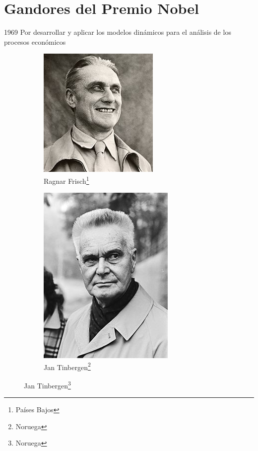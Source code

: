 \documentclass[aspectratio=169]{beamer}
\begin{document}
    \section{Gandores del Premio Nobel}
        \begin{frame}[t]{1969}
            \justify
            Por desarrollar y aplicar los modelos dinámicos para el análisis de los procesos económicos
            \begin{figure}[ht]
                \centering
                \caption{Ganadores del Premio Nobel de Economía en 1969}
                \begin{subfigure}[b]{0.49\textwidth}
                    \centering
                    \includegraphics[scale = 0.4]{ImgEconomy/RagnarFrisch.jpg}
                    \caption{Ragnar Frisch\footnote{Países Bajos}}
                    \label{fig: RagnarFrisch}
                \end{subfigure}
                \hfill 
                \begin{subfigure}[b]{0.49\textwidth}
                    \centering
                    \includegraphics[scale = 0.3]{ImgEconomy/JanTinbergen.jpg}
                    \caption{Jan Tinbergen\footnote{Noruega}}
                    \label{fig: JanTinbergen}
                \end{subfigure}
                \label{fig: Ganadores1969}
            \end{figure}
        \end{frame}
\end{document}
